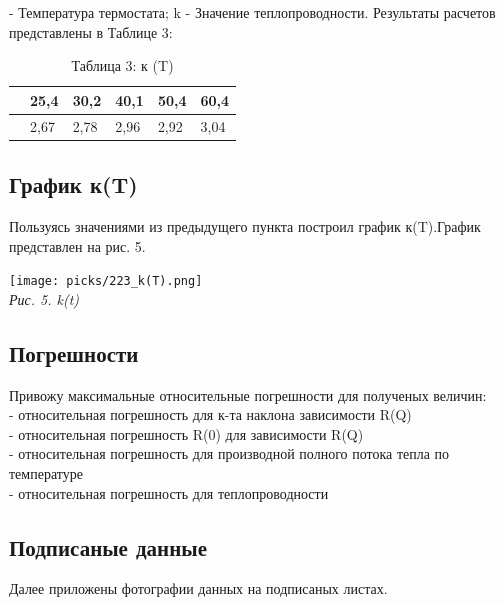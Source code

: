 \noindent{} - Температура термостата; k - Значение теплопроводности. Результаты расчетов представлены в Таблице 3:

\begin{table}[h!]
    \begin{center}
        \caption*{\color[HTML]{000000}Таблица 3: к (T)}
        \begin{tabular}{|P{3cm}|P{1.3cm}|P{1.3cm}|P{1.3cm}|P{1.3cm}|P{1.3cm}|}
        \hline

                		         & 25,4  & 30,2  & 40,1  & 50,4  & 60,4 \\  
            \hline
             & 2,67 & 2,78 & 2,96 & 2,92 & 3,04 \\

        \hline    		
        \end{tabular}
    \end{center}
\end{table}

\subsection{График к(T)}

Пользуясь значениями из предыдущего пункта построил график к(T).\linebreak График представлен на рис. 5. \\

\begin{center}
    \texttt{[image: picks/223\_k(T).png]} \\
    \textit{\textcolor[HTML]{000000}{Рис. 5. k(t)}}
\end{center} 

\newpage

\subsection{Погрешности}

Привожу максимальные относительные погрешности для полученых величин: \\[0.2cm]

\noindent{} - относительная погрешность для к-та наклона зависимости R(Q) \\

\noindent{} - относительная погрешность R(0) для зависимости R(Q) \\

\noindent{} - относительная погрешность для производной полного потока тепла по температуре \\

\noindent{} - относительная погрешность для теплопроводности \\

\subsection{Подписаные данные}

Далее приложены фотографии данных на подписаных листах.
\newpage
